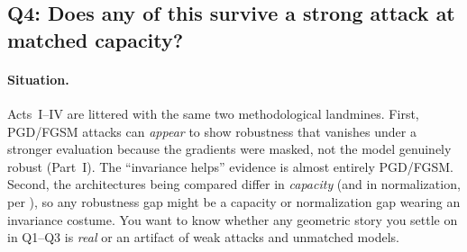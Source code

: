 \subsection{Q4: Does any of this survive a strong attack at matched capacity?}
\label{sub:p2-q4}

\paragraph{Situation.} Acts~I--IV are littered with the same two methodological landmines. First,
PGD/FGSM attacks can \emph{appear} to show robustness that vanishes under a stronger evaluation
because the gradients were masked, not the model genuinely robust (Part~I). The ``invariance helps''
evidence is almost entirely PGD/FGSM. Second, the architectures being compared differ in
\emph{capacity} (and in normalization, per \citet{galloway2019}), so any robustness gap might be a
capacity or normalization gap wearing an invariance costume. You want to know whether any geometric
story you settle on in Q1--Q3 is \emph{real} or an artifact of weak attacks and unmatched models.

